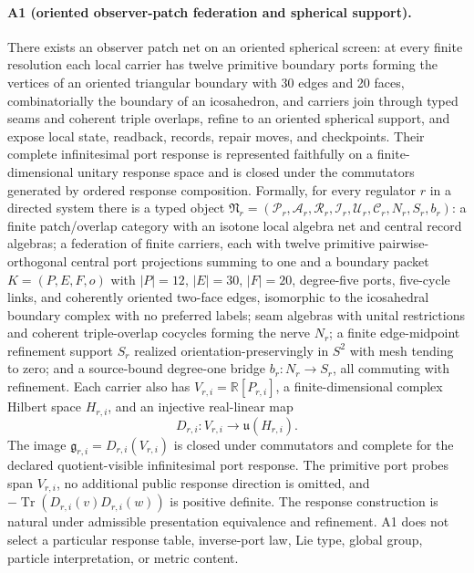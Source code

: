 
\paragraph{A1 (oriented observer-patch federation and spherical support).}
There exists an observer patch net on an oriented spherical screen: at every
finite resolution each local carrier has twelve primitive boundary ports
forming the vertices of an oriented triangular boundary with 30 edges and 20
faces, combinatorially the boundary of an icosahedron, and carriers join
through typed seams and coherent triple overlaps, refine to an oriented
spherical support, and expose local state, readback, records, repair moves,
and checkpoints. Their complete infinitesimal port response is represented
faithfully on a finite-dimensional unitary response space and is closed under
the commutators generated by ordered response composition. Formally, for
every regulator \(r\) in a
directed system there is a typed object
\(\mathfrak N_r=(\mathcal P_r,\mathcal A_r,\mathcal R_r,\mathcal I_r,
\mathcal U_r,\mathcal C_r,N_r,S_r,b_r)\):
a finite patch/overlap category with an isotone local algebra net and
central record algebras; a federation of finite carriers, each with twelve
primitive pairwise-orthogonal central port projections summing to one and a
boundary packet \(K=(P,E,F,o)\) with \(|P|=12\), \(|E|=30\), \(|F|=20\),
degree-five ports, five-cycle links, and coherently oriented two-face edges,
isomorphic to the icosahedral boundary complex with no preferred labels;
seam algebras with unital restrictions and coherent triple-overlap cocycles
forming the nerve \(N_r\); a finite edge-midpoint refinement support
\(S_r\) realized orientation-preservingly in \(S^2\) with mesh tending to
zero; and a source-bound degree-one bridge \(b_r:N_r\to S_r\), all commuting
with refinement. Each carrier also has
\(V_{r,i}=\mathbb R[P_{r,i}]\), a finite-dimensional complex Hilbert space
\(H_{r,i}\), and an injective real-linear map
\[
D_{r,i}:V_{r,i}\longrightarrow\mathfrak u(H_{r,i}).
\]
The image \(\mathfrak g_{r,i}=D_{r,i}(V_{r,i})\) is closed under
commutators and complete for the declared quotient-visible infinitesimal
port response. The primitive port probes span \(V_{r,i}\), no additional
public response direction is omitted, and
\(-\operatorname{Tr}(D_{r,i}(v)D_{r,i}(w))\) is positive definite. The
response construction is natural under admissible presentation equivalence
and refinement. A1 does not select a particular response table,
inverse-port law, Lie type, global group, particle interpretation, or metric
content.

